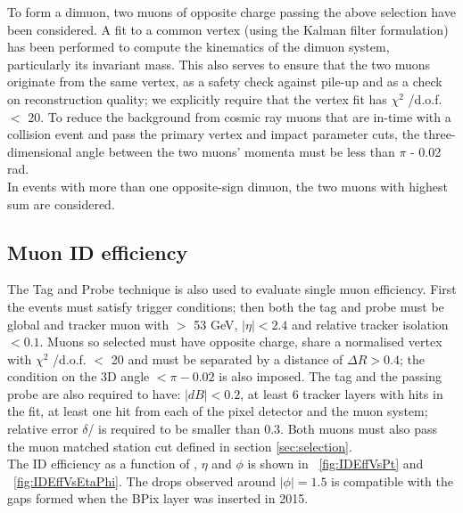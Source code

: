 To form a dimuon, two muons of opposite charge passing the above selection have been considered. A fit to a common vertex (using the Kalman filter formulation) has been performed to compute the kinematics of the dimuon system, particularly its invariant mass. This also serves to ensure that the two muons originate from the same vertex, as a safety check against pile-up and as a check on reconstruction quality; we explicitly require that the vertex fit has $\chi^2$ /d.o.f. $<$ 20. To reduce the background from cosmic ray muons that are in-time with a collision event and pass the primary vertex and impact parameter cuts, the three-dimensional angle between the two muons' momenta must be less than $\pi$ - 0.02 rad.\\
In events with more than one opposite-sign dimuon, the two muons with highest \pt sum are considered. \\

\subsection{Muon ID efficiency}
\label{sec:IDefficiency}
The Tag and Probe technique is also used to evaluate single muon efficiency. First the events must satisfy trigger conditions; then both the tag and probe must be global and tracker muon with \pt$>$ 53 GeV, $|\eta|<2.4$ and relative tracker isolation $<0.1$. Muons so selected must have opposite charge, share a normalised vertex with $\chi^2$ /d.o.f. $<$ 20 and must be separated by a distance of $\Delta R>0.4$; the condition on the 3D angle $<\pi-0.02$ is also imposed. The tag and the passing probe are also required to have: $|dB|<0.2$, at least 6 tracker layers with hits in the fit, at least one hit from each of the pixel detector and the muon system; relative \pt error $\delta$\pt / \pt is required to be smaller than 0.3. Both muons must also pass the muon matched station cut defined in section \ref{sec:selection}. \\
The ID efficiency as a function of \pt, $\eta$ and $\phi$ is shown in \figurename~\ref{fig:IDEffVsPt} and \figurename~\ref{fig:IDEffVsEtaPhi}. The drops observed around $|\phi|=1.5$ is compatible with the gaps formed when the BPix layer was inserted in 2015.

